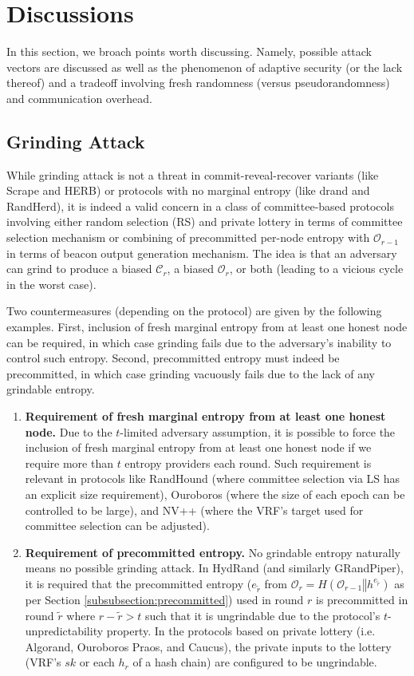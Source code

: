 \documentclass[letterpaper,twocolumn,10pt]{article}
\theoremstyle{definition}
\theoremstyle{remark}
\begin{document}
\section{Discussions}
\label{section:discussions}
In this section, we broach points worth discussing. Namely, possible attack vectors are discussed as well as the phenomenon of adaptive security (or the lack thereof) and a tradeoff involving fresh randomness (versus pseudorandomness) and communication overhead.

\subsection{Grinding Attack}
While grinding attack is not a threat in commit-reveal-recover variants (like Scrape and HERB) or protocols with no marginal entropy (like drand and RandHerd), it is indeed a valid concern in a class of committee-based protocols involving either random selection (RS) and private lottery in terms of committee selection mechanism or combining of precommitted per-node entropy with $\mathcal{O}_{r - 1}$ in terms of beacon output generation mechanism. The idea is that an adversary can grind to produce a biased $\mathcal{C}_r$, a biased $\mathcal{O}_r$, or both (leading to a vicious cycle in the worst case).

Two countermeasures (depending on the protocol) are given by the following examples. First, inclusion of fresh marginal entropy from at least one honest node can be required, in which case grinding fails due to the adversary's inability to control such entropy. Second, precommitted entropy must indeed be precommitted, in which case grinding vacuously fails due to the lack of any grindable entropy.
\begin{enumerate}
\item \textbf{Requirement of fresh marginal entropy from at least one honest node.} Due to the $t$-limited adversary assumption, it is possible to force the inclusion of fresh marginal entropy from at least one honest node if we require more than $t$ entropy providers each round. Such requirement is relevant in protocols like RandHound (where committee selection via LS has an explicit size requirement), Ouroboros (where the size of each epoch can be controlled to be large), and NV++ (where the VRF's target used for committee selection can be adjusted).
\item \textbf{Requirement of precommitted entropy.} No grindable entropy naturally means no possible grinding attack. In HydRand (and similarly GRandPiper), it is required that the precommitted entropy ($e_{\tilde{r}}$ from $\mathcal{O}_r = H(\mathcal{O}_{r - 1} \mathbin\Vert h^{e_{\tilde{r}}})$ as per Section \ref{subsubsection:precommitted}) used in round $r$ is precommitted in round $\tilde{r}$ where $r - \tilde{r} > t$ such that it is ungrindable due to the protocol's $t$-unpredictability property. In the protocols based on private lottery (i.e. Algorand, Ouroboros Praos, and Caucus), the private inputs to the lottery (VRF's $sk$ or each $h_r$ of a hash chain) are configured to be ungrindable.
\end{enumerate}
\end{document}
